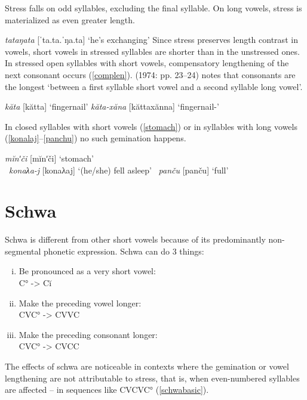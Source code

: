 \documentclass[a4paper, 12pt]{article}
\begin{document}
	Stress falls on odd syllables, excluding the final syllable. On long vowels, stress is materialized as even greater length.

	\ex\label{}\emph{tataŋata} [ˈta.ta.ˈŋa.ta] \hfill `he’s exchanging' \xe
	Since stress preserves length contrast in vowels, short vowels in stressed syllables are shorter than in the unstressed ones. In stressed open syllables with short vowels, compensatory lengthening of the next consonant occurs (\ref{complen}). \citeauthor{sammallahti1974} (1974: pp. 23--24) notes that consonants are the longest `between a first syllable short vowel and a second syllable long vowel'.

	\pex\label{complen}\a \emph{kăta} [kătta] \hfill `fingernail'
		\a \emph{kăta-xăna} [kăttaxănna] \hfill `fingernail-{\Ins}'
	\xe
	
	In closed syllables with short vowels (\ref{stomach}) or in syllables with long vowels (\ref{konalaj}--\ref{panchu}) no such gemination happens.
	
	\ex\label{stomach}\emph{mĭnʹči} [mĭnʹči] \hfill `stomach' 	\\\hfill \parencite[p. 22]{sammallahti1974}\xe
	\ex~\label{konalaj}\emph{konaλa-j} [konaλaj] \hfill `(he/she) fell asleep' \xe
	\ex~\label{panchu}\emph{panču} [panču] \hfill `full' \\\hfill \parencite[p. 22]{sammallahti1974}\xe
	
		\section{Schwa}
	
	Schwa is different from other short vowels because of its predominantly non-segmental phonetic expression. Schwa can do 3 things:
	
	\begin{enumerate}[i.]
		\item Be pronounced as a very short vowel:\\ 
			C° -> Cĭ
		\item Make the preceding vowel longer:\\
			CVC° -> CVVC
		\item Make the preceding consonant longer:\\ 
			CVC° -> CVCC
	\end{enumerate}
	The effects of schwa are noticeable in contexts where the gemination or vowel lengthening are not attributable to stress, that is, when even-numbered syllables are affected -- in sequences like CVCVC° (\ref{schwabasic}).
	
\end{document}
